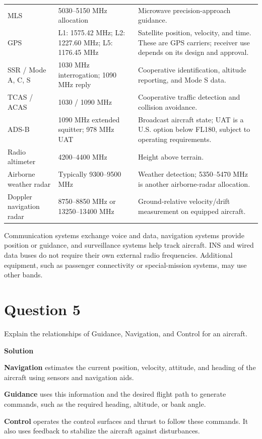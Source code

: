\documentclass[12pt,a4paper]{article}
\begin{document}
\begin{longtable}{@{}P{3.1cm}P{5.0cm}P{7.2cm}@{}}
\addlinespace
MLS & 5030--5150 MHz allocation & Microwave precision-approach guidance. \\
\addlinespace
GPS & L1: 1575.42 MHz; L2: 1227.60 MHz; L5: 1176.45 MHz & Satellite position, velocity, and time. These are GPS carriers; receiver use depends on its design and approval. \\
\addlinespace
SSR / Mode A, C, S & 1030 MHz interrogation; 1090 MHz reply & Cooperative identification, altitude reporting, and Mode S data. \\
\addlinespace
TCAS / ACAS & 1030 / 1090 MHz & Cooperative traffic detection and collision avoidance. \\
\addlinespace
ADS-B & 1090 MHz extended squitter; 978 MHz UAT & Broadcast aircraft state; UAT is a U.S. option below FL180, subject to operating requirements. \\
\addlinespace
Radio altimeter & 4200--4400 MHz & Height above terrain. \\
\addlinespace
Airborne weather radar & Typically 9300--9500 MHz & Weather detection; 5350--5470 MHz is another airborne-radar allocation. \\
\addlinespace
Doppler navigation radar & 8750--8850 MHz or 13250--13400 MHz & Ground-relative velocity/drift measurement on equipped aircraft. \\
\end{longtable}
\normalsize

Communication systems exchange voice and data, navigation systems provide position
or guidance, and surveillance systems help track aircraft. INS and wired data buses
do not require their own external radio frequencies. Additional equipment, such as
passenger connectivity or special-mission systems, may use other bands.

\newpage
\section*{Question 5}
Explain the relationships of Guidance, Navigation, and Control for an aircraft.

\textbf{Solution}

\textbf{Navigation} estimates the current position, velocity, attitude, and heading
of the aircraft using sensors and navigation aids.

\textbf{Guidance} uses this information and the desired flight path to generate
commands, such as the required heading, altitude, or bank angle.

\textbf{Control} operates the control surfaces and thrust to follow these commands.
It also uses feedback to stabilize the aircraft against disturbances.
\end{document}
